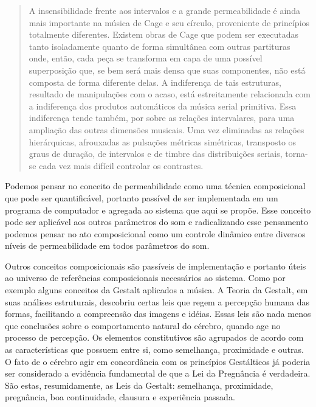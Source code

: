 \documentclass[draft]{ppgmus}
\begin{document}
\begin{quote}
  A insensibilidade frente aos intervalos e a grande permeabilidade é
  ainda mais importante na música de Cage e seu círculo, proveniente
  de princípios totalmente diferentes. Existem obras de Cage que podem
  ser executadas tanto isoladamente quanto de forma simultânea com
  outras partituras onde, então, cada peça se transforma em capa de
  uma possível superposição que, se bem será mais densa que suas
  componentes, não está composta de forma diferente delas. A
  indiferença de tais estruturas, resultado de manipulações com o
  acaso, está estreitamente relacionada com a indiferença dos produtos
  automáticos da música serial primitiva. Essa indiferença tende
  também, por sobre as relações intervalares, para uma ampliação das
  outras dimensões musicais. Uma vez eliminadas as relações
  hierárquicas, afrouxadas as pulsações métricas simétricas,
  transposto os graus de duração, de intervalos e de timbre das
  distribuições seriais, torna-se cada vez mais difícil controlar os
  contrastes.
\end{quote}

Podemos pensar no conceito de permeabilidade como uma técnica composicional
que pode ser quantificável, portanto passível de ser implementada em um programa
de computador e agregada ao sistema que aqui se propõe. Esse conceito pode ser
aplicável aos outros parâmetros do som e radicalizando esse pensamento podemos
pensar no ato composicional como um controle dinâmico entre diversos níveis de 
permeabilidade em todos parâmetros do som.


Outros conceitos composicionais são passíveis de implementação e portanto úteis 
ao universo de referências composicionais necessários ao sistema. Como por exemplo 
alguns conceitos da Gestalt aplicados a música. A Teoria da Gestalt, em suas análises estruturais, 
descobriu certas leis que regem a
percepção humana das formas, facilitando a compreensão das imagens e idéias. Essas leis são
nada menos que conclusões sobre o comportamento natural do cérebro, quando age no
processo de percepção. Os elementos constitutivos são agrupados de acordo com as
características que possuem entre si, como semelhança, proximidade e outras. O fato de o cérebro agir 
em concordância com os princípios Gestálticos já poderia ser
considerado a evidência fundamental de que a Lei da Pregnância é verdadeira. São estas,
resumidamente, as Leis da Gestalt: semelhança, proximidade, pregnância, boa continuidade, clausura e 
experiência passada.
\end{document}
